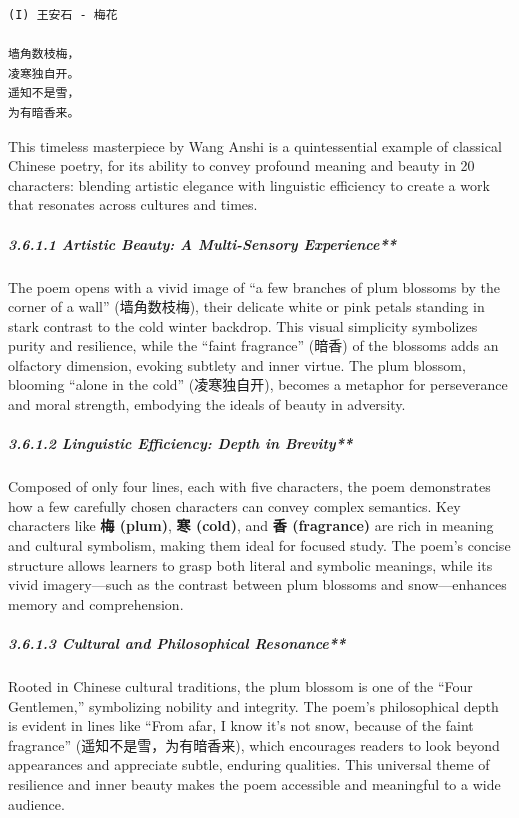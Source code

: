 \documentclass[
]{article}
\begin{document}
\begin{verbatim}
(I) 王安石 - 梅花

墙角数枝梅，
凌寒独自开。
遥知不是雪，
为有暗香来。
\end{verbatim}

This timeless masterpiece by Wang Anshi is a quintessential example of
classical Chinese poetry, for its ability to convey profound meaning and
beauty in 20 characters: blending artistic elegance with linguistic
efficiency to create a work that resonates across cultures and times.

\subparagraph{3.6.1.1 Artistic Beauty: A Multi-Sensory
Experience**}\label{artistic-beauty-a-multi-sensory-experience}

The poem opens with a vivid image of ``a few branches of plum blossoms
by the corner of a wall'' (墙角数枝梅), their delicate white or pink
petals standing in stark contrast to the cold winter backdrop. This
visual simplicity symbolizes purity and resilience, while the ``faint
fragrance'' (暗香) of the blossoms adds an olfactory dimension, evoking
subtlety and inner virtue. The plum blossom, blooming ``alone in the
cold'' (凌寒独自开), becomes a metaphor for perseverance and moral
strength, embodying the ideals of beauty in adversity.

\subparagraph{3.6.1.2 Linguistic Efficiency: Depth in
Brevity**}\label{linguistic-efficiency-depth-in-brevity}

Composed of only four lines, each with five characters, the poem
demonstrates how a few carefully chosen characters can convey complex
semantics. Key characters like \textbf{梅 (plum)}, \textbf{寒 (cold)},
and \textbf{香 (fragrance)} are rich in meaning and cultural symbolism,
making them ideal for focused study. The poem's concise structure allows
learners to grasp both literal and symbolic meanings, while its vivid
imagery---such as the contrast between plum blossoms and snow---enhances
memory and comprehension.

\subparagraph{3.6.1.3 Cultural and Philosophical
Resonance**}\label{cultural-and-philosophical-resonance}

Rooted in Chinese cultural traditions, the plum blossom is one of the
``Four Gentlemen,'' symbolizing nobility and integrity. The poem's
philosophical depth is evident in lines like ``From afar, I know it's
not snow, because of the faint fragrance'' (遥知不是雪，为有暗香来),
which encourages readers to look beyond appearances and appreciate
subtle, enduring qualities. This universal theme of resilience and inner
beauty makes the poem accessible and meaningful to a wide audience.
\end{document}
